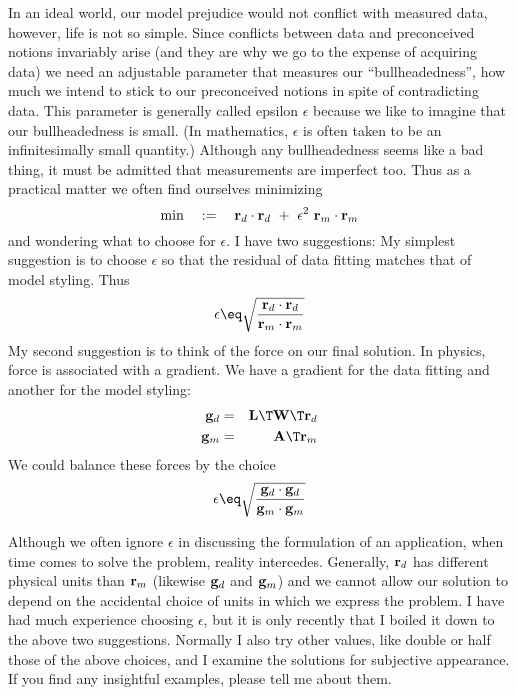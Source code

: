 \par
In an ideal world, our model prejudice would not conflict
with measured data, however,
life is not so simple.
Since conflicts between data and preconceived notions invariably arise
(and they are why we go to the expense of acquiring data)
we need an adjustable parameter
that measures our ``bullheadedness'', how much we intend
to stick to our preconceived notions in spite of contradicting data.
This parameter is generally called epsilon $\epsilon$
because we like to imagine that our bullheadedness is small.
(In mathematics, $\epsilon$ is often taken to be
an infinitesimally small quantity.)
Although any bullheadedness seems like a bad thing,
it must be admitted that measurements are imperfect too.
Thus as a practical matter we often find ourselves minimizing
\begin{equation}
\min \quad := \quad
\bold r_d \cdot \bold r_d \ +\  \epsilon^2\ \bold r_m \cdot \bold r_m 
\end{equation}
and wondering what to choose for $\epsilon$.
I have two suggestions:
My simplest suggestion is to choose $\epsilon$
so that the residual of data fitting matches that of model styling.
Thus
\begin{equation}
\epsilon \eq \sqrt{\frac{ \bold r_d \cdot \bold r_d }{ \bold r_m \cdot \bold r_m }}
\end{equation}
My second suggestion is to think of the force on our final solution.
In physics, force is associated with a gradient.
We have a gradient for the data fitting
and another for the model styling:
\begin{eqnarray}
\bold g_d &=& \bold L\T \bold W\T \bold r_d  \\
\bold g_m &=& \bold A\T \bold r_m
\end{eqnarray}
We could balance these forces by the choice
\begin{equation}
\epsilon \eq \sqrt{
\bold g_d \cdot \bold g_d
\over
\bold g_m \cdot \bold g_m 
}
\end{equation}

Although we often ignore $\epsilon$ in discussing the formulation
of an application, when time comes to solve the problem, reality intercedes.
Generally, $\bold r_d$ has different physical units than $\bold r_m$
(likewise $\bold g_d$ and $\bold g_m$)
and we cannot allow our solution
to depend on the accidental choice of units
in which we express the problem.
I have had much experience choosing $\epsilon$, but it is
only recently that I boiled it down to the above two suggestions.
Normally I also try other values, like double or half those
of the above choices,
and I examine the solutions for subjective appearance.
If you find any insightful examples, please tell me about them.

